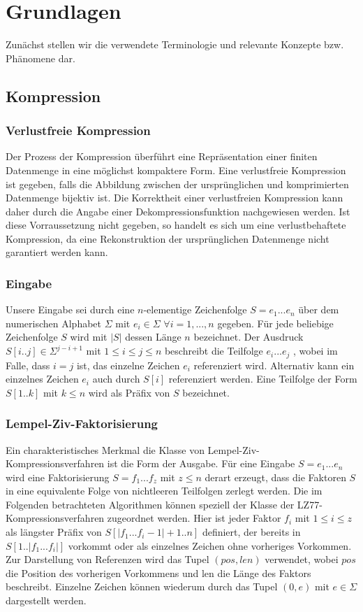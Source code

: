 \chapter{Grundlagen}

Zunächst stellen wir die verwendete Terminologie und relevante Konzepte bzw. Phänomene dar.

\section{Kompression} \label{comp}

\subsection{Verlustfreie Kompression}
Der Prozess der Kompression überführt eine Repräsentation einer finiten Datenmenge in eine möglichst kompaktere Form. Eine verlustfreie Kompression ist gegeben, falls die Abbildung
zwischen der ursprünglichen und komprimierten Datenmenge bijektiv ist. Die Korrektheit einer verlustfreien Kompression kann daher durch die Angabe einer Dekompressionsfunktion nachgewiesen werden.
Ist diese Vorraussetzung nicht gegeben, so handelt es sich um eine verlustbehaftete Kompression, da eine Rekonstruktion der ursprünglichen Datenmenge nicht garantiert werden kann.

\subsection{Eingabe}
Unsere Eingabe sei durch eine $n$-elementige Zeichenfolge $S=e_1...e_n$ über dem numerischen Alphabet $\Sigma$ mit $e_i\in \Sigma$ $\forall i=1,...,n$ gegeben. Für jede
beliebige Zeichenfolge $S$ wird mit $|S|$ dessen Länge $n$ bezeichnet. Der Ausdruck $S[i..j]\in \Sigma^{j-i+1}$ mit $1\leq i\leq j\leq n$ beschreibt die Teilfolge $e_i...e_j$ , wobei im Falle, 
dass $i=j$ ist, das einzelne Zeichen $e_i$ referenziert wird. Alternativ kann ein einzelnes Zeichen $e_i$ auch durch $S[i]$ referenziert werden. Eine Teilfolge der Form 
$S[1..k]$ mit $k\leq n$ wird als Präfix von $S$ bezeichnet.

\subsection{Lempel-Ziv-Faktorisierung}
Ein charakteristisches Merkmal die Klasse von Lempel-Ziv-Kompressionsverfahren ist die Form der Ausgabe. Für eine Eingabe $S=e_1...e_n$ wird eine Faktorisierung $S=f_1...f_z$ 
mit $z\leq n$ derart erzeugt, dass die Faktoren $S$ in eine equivalente Folge von nichtleeren Teilfolgen zerlegt werden. Die im Folgenden betrachteten Algorithmen können speziell der Klasse
der LZ77-Kompressionsverfahren zugeordnet werden. Hier ist jeder Faktor $f_i$ mit $1\leq i\leq z$ als längster Präfix von $S[|f_1...f_i-1|+1..n]$ definiert, der bereits in 
$S[1..|f_1...f_i|]$ vorkommt oder als einzelnes Zeichen ohne vorheriges Vorkommen. Zur Darstellung von Referenzen wird das Tupel $(pos, len)$ verwendet, wobei $pos$ die Position des vorherigen
Vorkommens und len die Länge des Faktors beschreibt. Einzelne Zeichen können wiederum durch das Tupel $(0, e)$ mit $e\in \Sigma$ dargestellt werden.
